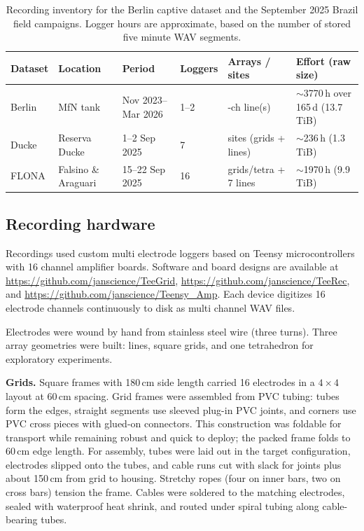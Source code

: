 \begin{table}[htbp]
  \centering
  \small
  \caption{Recording inventory for the Berlin captive dataset and the September 2025 Brazil field campaigns.
  Logger hours are approximate, based on the number of stored five minute WAV segments.}
  \label{tab:recording_inventory}
  \begin{tabularx}{\textwidth}{llll>{\raggedright\arraybackslash}X>{\raggedright\arraybackslash}X}
    \toprule
    \textbf{Dataset} & \textbf{Location} & \textbf{Period} & \textbf{Loggers} & \textbf{Arrays / sites} & \textbf{Effort (raw size)} \\
    \midrule
    Berlin & MfN tank & Nov 2023--Mar 2026 & 1--2 & 16-ch line(s) & $\sim$3770\,h over 165\,d (13.7\,TiB) \\
    Ducke & Reserva Ducke & 1--2 Sep 2025 & 7 & 4 sites (grids + lines) & $\sim$236\,h (1.3\,TiB) \\
    FLONA & Falsino \& Araguari & 15--22 Sep 2025 & 16 & 9 grids/tetra + 7 lines & $\sim$1970\,h (9.9\,TiB) \\
    \bottomrule
  \end{tabularx}
\end{table}

\subsection{Recording hardware}
\label{sec:recording_hardware}

Recordings used custom multi electrode loggers based on Teensy microcontrollers with 16 channel amplifier boards.
Software and board designs are available at \url{https://github.com/janscience/TeeGrid}, \url{https://github.com/janscience/TeeRec}, and \url{https://github.com/janscience/Teensy_Amp}. 
Each device digitizes 16 electrode channels continuously to disk as multi channel WAV files.

Electrodes were wound by hand from stainless steel wire (three turns). 
Three array geometries were built: lines, square grids, and one tetrahedron for exploratory experiments. 

\textbf{Grids.} Square frames with 180\,cm side length carried 16 electrodes in a $4 \times 4$ layout at 60\,cm spacing.
Grid frames were assembled from PVC tubing: tubes form the edges, straight segments use sleeved plug-in PVC joints, and corners use PVC cross pieces with glued-on connectors.
This construction was foldable for transport while remaining robust and quick to deploy; the packed frame folds to 60\,cm edge length.
For assembly, tubes were laid out in the target configuration, electrodes slipped onto the tubes, and cable runs cut with slack for joints plus about 150\,cm from grid to housing.
Stretchy ropes (four on inner bars, two on cross bars) tension the frame.
Cables were soldered to the matching electrodes, sealed with waterproof heat shrink, and routed under spiral tubing along cable-bearing tubes.

